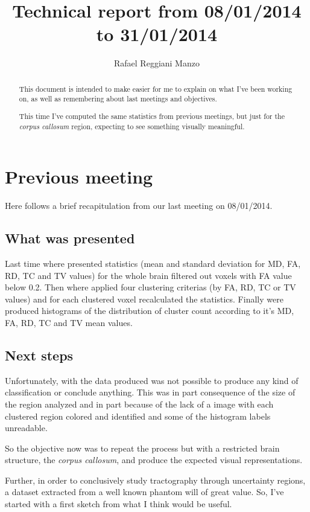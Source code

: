 \documentclass[a4paper,11pt]{report}
\title{Technical report from 08/01/2014 to 31/01/2014}
\author{Rafael Reggiani Manzo}
\begin{document}
\maketitle
\tableofcontents

\begin{abstract}
  This document is intended to make easier for me to explain on what I've been working on, as well as remembering about last meetings and objectives.

  This time I've computed the same statistics from previous meetings, but just for the \textit{corpus callosum} region, expecting to see something visually meaningful.
\end{abstract}

\chapter{Previous meeting}
Here follows a brief recapitulation from our last meeting on 08/01/2014.

  \section{What was presented}
  Last time where presented statistics (mean and standard deviation for MD, FA, RD, TC and TV values) for the whole brain filtered out voxels with FA value below 0.2. Then where applied four clustering criterias (by FA, RD, TC or TV values) and for each clustered voxel recalculated the statistics. Finally were produced histograms of the distribution of cluster count according to it's MD, FA, RD, TC and TV mean values.

  \section{Next steps}
  Unfortunately, with the data produced was not possible to produce any kind of classification or conclude anything. This was in part consequence of the size of the region analyzed and in part because of the lack of a image with each clustered region colored and identified and some of the histogram labels unreadable.

  So the objective now was to repeat the process but with a restricted brain structure, the \textit{corpus callosum}, and produce the expected visual representations.

  Further, in order to conclusively study tractography through uncertainty regions, a dataset extracted from a well known phantom will of great value. So, I've started with a first sketch from what I think would be useful.
\end{document}
